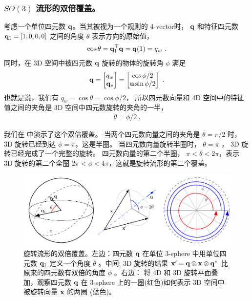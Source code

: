 \subsubsection{ $SO(3)$ 流形的双倍覆盖。}
\label{sec:double_cover}

考虑一个单位四元数 ${\bf q}$。当其被视为一个规则的 4-vector时， ${\bf q}$ 和特征四元数 ${\bf q}_1=[1,0,0,0]$ 之间的角度 $\theta$ 表示方向的原始值，
%
\begin{align}
\cos\theta = {\bf q}_1^{\top}{\bf q} = {\bf q}(1) = q_w
~.
\end{align}
%
同时，在 3D 空间中被四元数 ${\bf q}$ 旋转的物体的旋转角 $\phi$ 满足
%
\begin{align}
{\bf q} = \begin{bmatrix}
q_w \\ {\bf q}_v
\end{bmatrix} = \begin{bmatrix}
\cos\phi/2 \\ {\bf u}\sin\phi/2
\end{bmatrix}
~.
\end{align}
%
也就是说，我们有 $q_w = \cos\theta = \cos\phi/2$，
所以四元数向量和 4D 空间中的特征值之间的夹角是 3D 空间中四元数旋转的夹角的一半，
%
\begin{align}
\theta = \phi/2
~.
\end{align}

我们在  中演示了这个双倍覆盖。
当两个四元数向量之间的夹角是 $\theta=\pi/2$ 时， 3D 旋转已经到达 $\phi=\pi$，这是半圈。 
当四元数向量旋转半圈时， $\theta=\pi$ ， 3D 旋转已经完成了一个完整的旋转。 
四元数向量的第二个半圈， $\pi<\theta<2\pi$，表示 3D 旋转的第二个全圈 $2\pi<\phi<4\pi$，这就是旋转流形的第二个覆盖。

\begin{figure}[htbp]
\begin{center}
\includegraphics{figures/double_cover}
\caption{旋转流形的双倍覆盖。左边：四元数 ${\bf q}$ 在单位 3-sphere 中用单位四元数 ${\bf q}_1$ 定义一个角度 $\theta$ 。中间: 3D 旋转的结果 ${\bf x}'={\bf q}\otimes{\bf x}\otimes{\bf q}^*$ 比原来的四元数有双倍的角度 $\phi$ 。右边： 将 4D 和 3D 旋转平面叠加，观察四元数 ${\bf q}$ 在 3-sphere 上的一圈(红色)如何表示 3D 空间中被旋转向量 ${\bf x}$ 的两圈 (蓝色)。}
\label{fig:double_cover}
\end{center}
\end{figure}


